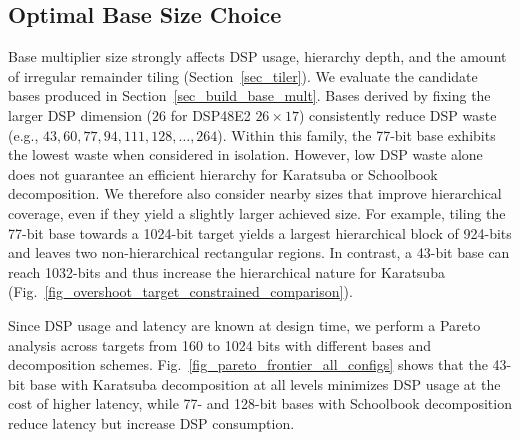 \documentclass[conference]{IEEEtran}
\begin{document}


    


\subsection{Optimal Base Size Choice}
Base multiplier size strongly affects DSP usage, hierarchy depth, and the amount of irregular remainder tiling (Section~\ref{sec_tiler}).
We evaluate the candidate bases produced in Section~\ref{sec_build_base_mult}.
Bases derived by fixing the larger DSP dimension ($26$ for DSP48E2 $26\times17$) consistently reduce DSP waste (e.g., $43, 60, 77, 94, 111, 128, \dots, 264$).
Within this family, the 77-bit base exhibits the lowest waste when considered in isolation.
However, low DSP waste alone does not guarantee an efficient hierarchy for Karatsuba or Schoolbook decomposition.
We therefore also consider nearby sizes that improve hierarchical coverage, even if they yield a slightly larger achieved size.
For example, tiling the 77-bit base towards a 1024-bit target yields a largest hierarchical block of 924-bits and leaves two non-hierarchical rectangular regions.
In contrast, a 43-bit base can reach 1032-bits and thus increase the hierarchical nature for Karatsuba (Fig.~\ref{fig_overshoot_target_constrained_comparison}).

Since DSP usage and latency are known at design time, we perform a Pareto analysis across targets from 160 to 1024 bits with different bases and decomposition schemes.
Fig.~\ref{fig_pareto_frontier_all_configs} shows that the 43-bit base with Karatsuba decomposition at all levels minimizes DSP usage at the cost of higher latency, while 77- and 128-bit bases with Schoolbook decomposition reduce latency but increase DSP consumption.
\end{document}
